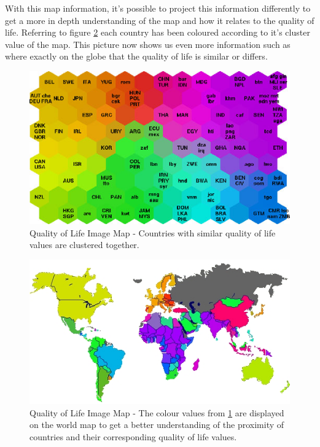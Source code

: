 \documentclass{IEEEtran}
\begin{document}
	With this map information, it's possible to project this information differently to get a more in depth understanding of the map and how it relates to the quality of life. Referring to figure \ref{fig:qolmap2} each country has been coloured according to it's cluster value of the map. This picture now shows us even more information such as where exactly on the globe that the quality of life is similar or differs.

\begin{figure}[!htbp]
\centering
\includegraphics[scale=0.45]{./images/quality_of_life_map1.jpg}
	\caption{Quality of Life Image Map - Countries with similar quality of life values are clustered together.}
\label{fig:qolmap1} 
\end{figure}	

\begin{figure}[!htbp]
\centering
\includegraphics[scale=0.45]{./images/quality_of_life_map2.jpg}
	\caption{Quality of Life Image Map - The colour values from \ref{fig:qolmap1} are displayed on the world map to get a better understanding of the proximity of countries and their corresponding quality of life values.}
\label{fig:qolmap2} 
\end{figure}	
	
\end{document}
